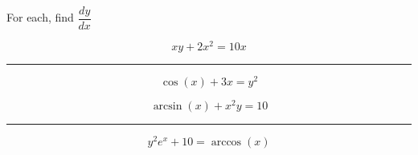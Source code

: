\documentclass{article}
\begin{document}
\begin{landscape}
\thispagestyle{empty}
\begin{center}

{\Huge For each, find $\dfrac{dy}{dx}$}

\end{center}
\begin{multicols}{2}

{\Huge


$$
xy + 2x^2 = 10x
$$

\vspace{0.5in}
\hrule
\vspace{0.5in}

$$
\cos(x) + 3x = y^2
$$
\columnbreak

$$
\arcsin(x) + x^2 y = 10
$$

\vspace{0.5in}
\hrule
\vspace{0.5in}

$$
y^2 e^x + 10 = \arccos(x)
$$

}

\end{multicols}
\end{landscape}
\end{document}
